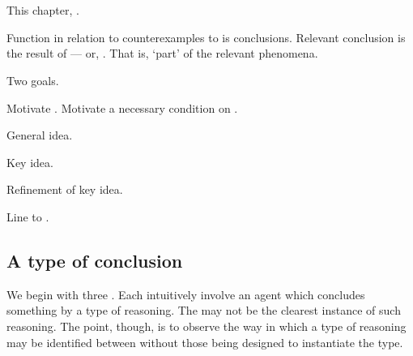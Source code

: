 \chapter{}
\label{cha:typical}
\nocite{Wilson:1994aa}

\begin{note}
  This chapter, \tC{}.

  Function in relation to counterexamples to \issueConstraint{} is conclusions.
  Relevant conclusion is the result of \tC{} --- or, \tC[reasoning]{}.
  That is, `part' of the relevant phenomena.

  Two goals.

  Motivate \tC{}.
  Motivate a necessary condition on \tC{}.
\end{note}

\begin{note}
  \begin{TOCEnum}
  \item

    General idea.
  \item

    Key idea.
  \item

    Refinement of key idea.
  \item

    Line \tC{} to .
  \end{TOCEnum}
\end{note}

\section{A type of conclusion}
\label{cha:typical:sec:g-s}

\begin{note}
  We begin with three .
  Each  intuitively involve an agent which concludes something by a type of reasoning.
  The  may not be the clearest instance of such reasoning.
  The point, though, is to observe the way in which a type of reasoning may be identified between  without those  being designed to instantiate the type.
\end{note}

